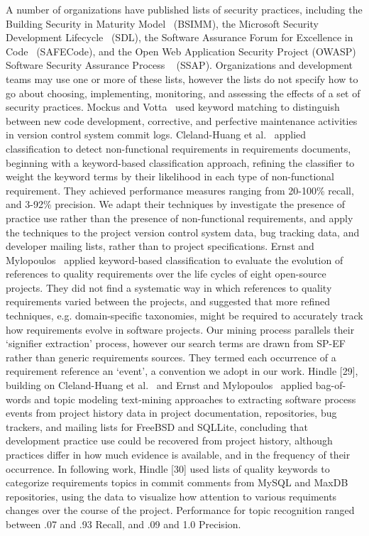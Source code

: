 A number of organizations have published lists of security practices, including the Building Security in Maturity Model~\cite{mcgraw2013bsimm} (BSIMM), the Microsoft Security Development Lifecycle~\cite{howard2009security} (SDL), the Software Assurance Forum for Excellence in Code~\cite{simpson2013fundamental} (SAFECode), and the Open Web Application Security Project (OWASP) Software Security Assurance Process ~\cite{martinez2014ssap} (SSAP). Organizations and development teams may use one or more of these lists, however the lists do not specify how to go about choosing, implementing, monitoring, and assessing the effects of a set of security practices.
Mockus and Votta~\cite{mockus2000identifying} used keyword matching to distinguish between new code development, corrective, and perfective maintenance activities in version control system commit logs.
Cleland-Huang et al.~\cite{clelandhuang2006detection} applied classification to detect non-functional requirements in requirements documents, beginning with a keyword-based classification approach, refining the classifier to weight the keyword terms by their likelihood in each type of non-functional requirement. They achieved performance measures ranging from 20-100\% recall, and 3-92\% precision. We adapt their techniques by investigate the presence of practice use rather than the presence of non-functional requirements, and apply the techniques to the project version control system data, bug tracking data, and developer mailing lists, rather than to project specifications.
Ernst and Mylopoulos~\cite{ernst10refsq} applied keyword-based classification to evaluate the evolution of references to quality requirements over the life cycles of eight open-source projects. They did not find a systematic way in which references to quality requirements varied between the projects, and suggested that more refined techniques, e.g. domain-specific taxonomies, might be required to accurately track how requirements evolve in software projects. Our mining process parallels their `signifier extraction' process, however our search terms are drawn from SP-EF rather than generic requirements sources. They termed each occurrence of a requirement reference an `event', a convention we adopt in our work.
Hindle [29], building on Cleland-Huang et al.~\cite{clelandhuang2006detection} and Ernst and Mylopoulos~\cite{ernst10refsq} applied bag-of-words and topic modeling text-mining approaches to extracting software process events from project history data in project documentation, repositories, bug trackers, and mailing lists for FreeBSD and SQLLite, concluding that development practice use could be recovered from project history, although practices differ in how much evidence is available, and in the frequency of their occurrence. In following work, Hindle [30] used lists of quality keywords to categorize requirements topics in commit comments from MySQL and MaxDB repositories, using the data to visualize how attention to various requiments changes over the course of the project. Performance for topic recognition ranged between .07 and .93 Recall, and .09 and 1.0 Precision. 
